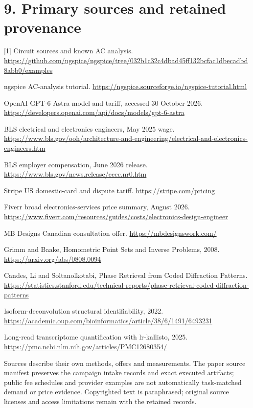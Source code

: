 \documentclass[10pt,letterpaper]{article}
\begin{document}
\section*{\color{accent}9. Primary sources and retained provenance}
[1] Circuit sources and known AC analysis. \url{https://github.com/ngspice/ngspice/tree/032b1c32c4dbad45ff132bcfac1dbecadbd8abb0/examples}\par
[2] ngspice AC-analysis tutorial. \url{https://ngspice.sourceforge.io/ngspice-tutorial.html}\par
[3] OpenAI GPT-6 Astra model and tariff, accessed 30 October 2026. \url{https://developers.openai.com/api/docs/models/gpt-6-astra}\par
[4] BLS electrical and electronics engineers, May 2025 wage. \url{https://www.bls.gov/ooh/architecture-and-engineering/electrical-and-electronics-engineers.htm}\par
[5] BLS employer compensation, June 2026 release. \url{https://www.bls.gov/news.release/ecec.nr0.htm}\par
[6] Stripe US domestic-card and dispute tariff. \url{https://stripe.com/pricing}\par
[7] Fiverr broad electronics-services price summary, August 2026. \url{https://www.fiverr.com/resources/guides/costs/electronics-design-engineer}\par
[8] MB Designs Canadian consultation offer. \url{https://mbdesignswork.com/}\par
[9] Grimm and Baake, Homometric Point Sets and Inverse Problems, 2008. \url{https://arxiv.org/abs/0808.0094}\par
[10] Candes, Li and Soltanolkotabi, Phase Retrieval from Coded Diffraction Patterns. \url{https://statistics.stanford.edu/technical-reports/phase-retrieval-coded-diffraction-patterns}\par
[11] Isoform-deconvolution structural identifiability, 2022. \url{https://academic.oup.com/bioinformatics/article/38/6/1491/6493231}\par
[12] Long-read transcriptome quantification with lr-kallisto, 2025. \url{https://pmc.ncbi.nlm.nih.gov/articles/PMC12680354/}\par
Sources describe their own methods, offers and measurements. The paper source manifest preserves the campaign intake records and exact executed artifacts; public fee schedules and provider examples are not automatically task-matched demand or price evidence. Copyrighted text is paraphrased; original source licenses and access limitations remain with the retained records.\par
\end{document}
